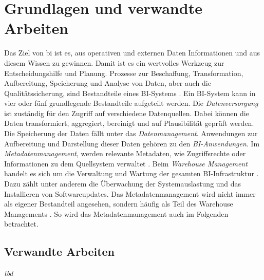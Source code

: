 \chapter{Grundlagen und verwandte Arbeiten} \label{ch:background}
Das Ziel von \ac{bi} ist es, aus operativen und externen Daten Informationen und aus diesem Wissen zu gewinnen. Damit ist es ein wertvolles Werkzeug zur Entscheidungshilfe und Planung. Prozesse zur Beschaffung, Transformation, Aufbereitung, Speicherung und Analyse von Daten, aber auch die Qualitätssicherung, sind Bestandteile eines BI-Systems \cite{muller_business_2013}. Ein BI-System kann in vier oder fünf grundlegende Bestandteile aufgeteilt werden. Die \textit{Datenversorgung} ist zuständig für den Zugriff auf verschiedene Datenquellen. Dabei können die Daten transformiert, aggregiert, bereinigt und auf Plausibilität geprüft werden. Die Speicherung der Daten fällt unter das \textit{Datenmanagement}. Anwendungen zur Aufbereitung und Darstellung dieser Daten gehören zu den \textit{BI-Anwendungen}. Im \textit{Metadatenmanagement}, werden relevante Metadaten, wie Zugriffsrechte oder Informationen zu dem Quellsystem verwaltet \cite{kemper_bi-glossar_2008}. Beim \textit{Warehouse Management} handelt es sich um die Verwaltung und Wartung der gesamten BI-Infrastruktur \cite{grunwald_business_2009}. Dazu zählt unter anderem die Überwachung der Systemauslastung und das Installieren von Softwareupdates. Das {Metadatenmanagement} wird nicht immer als eigener Bestandteil angesehen, sondern häufig als Teil des {Warehouse Managements} \cite{humm_architektur_2005}. So wird das {Metadatenmanagement} auch im Folgenden betrachtet.

\section{Verwandte Arbeiten} \label{ch:verwandteArbeiten}
\textit{tbd}

